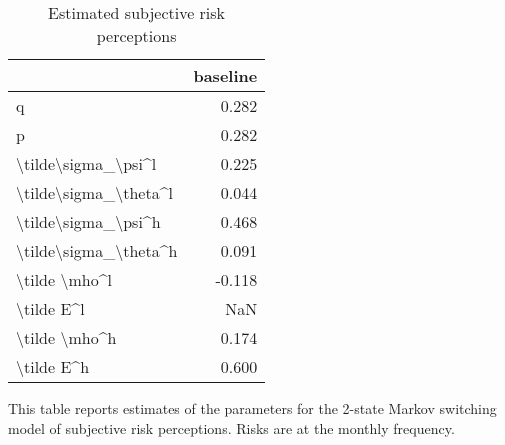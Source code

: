 
\begin{table}[p]
\centering
\begin{adjustbox}{width=0.3\textwidth}
\begin{threeparttable}
\caption{Estimated subjective risk perceptions}
\label{tab:PRMarkovEst}\begin{tabular}{lr}
\toprule
{} &  baseline \\
\midrule
q                     &     0.282 \\
p                     &     0.282 \\
\textbackslash tilde\textbackslash sigma\_\textbackslash psi\textasciicircum l   &     0.225 \\
\textbackslash tilde\textbackslash sigma\_\textbackslash theta\textasciicircum l &     0.044 \\
\textbackslash tilde\textbackslash sigma\_\textbackslash psi\textasciicircum h   &     0.468 \\
\textbackslash tilde\textbackslash sigma\_\textbackslash theta\textasciicircum h &     0.091 \\
\textbackslash tilde \textbackslash mho\textasciicircum l         &    -0.118 \\
\textbackslash tilde E\textasciicircum l            &       NaN \\
\textbackslash tilde \textbackslash mho\textasciicircum h         &     0.174 \\
\textbackslash tilde E\textasciicircum h            &     0.600 \\
\bottomrule
\end{tabular}
\begin{tablenotes}\item This table reports estimates of the parameters 
for the 2-state Markov switching model of subjective risk perceptions. Risks are at the monthly frequency. 
\end{tablenotes}
\end{threeparttable}
\end{adjustbox}
\end{table}